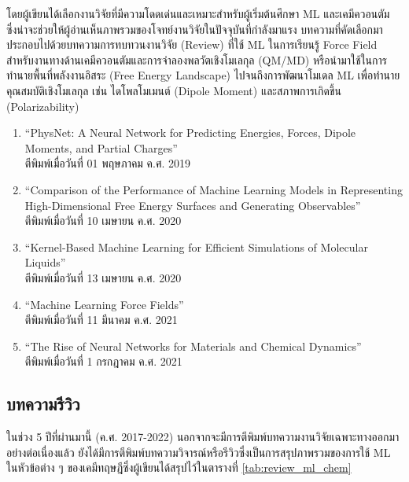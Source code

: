 โดยผู้เขียนได้เลือกงานวิจัยที่มีความโดดเด่นและเหมาะสำหรับผู้เริ่มต้นศึกษา ML และเคมีควอนตัม ซึ่งน่าจะช่วยให้ผู้อ่านเห็นภาพรวมของโจทย์งานวิจัยในปัจจุบันที่กำลังมาแรง บทความที่คัดเลือกมาประกอบไปด้วยบทความการทบทวนงานวิจัย (Review) ที่ใช้ ML ในการเรียนรู้ Force Field สำหรับงานทางด้านเคมีควอนตัมและการจําลองพลวัตเชิงโมเลกุล (QM/MD) หรือนำมาใช้ในการทำนายพื้นที่พลังงานอิสระ (Free Energy Landscape) ไปจนถึงการพัฒนาโมเดล ML เพื่อทำนายคุณสมบัติเชิงโมเลกุล เช่น ไดโพลโมเมนต์ (Dipole Moment) และสภาพการเกิดขึ้น (Polarizability)
%
\begin{enumerate}[topsep=0pt,noitemsep]\setlength\itemsep{0.5em}
    \item \enquote{PhysNet: A Neural Network for Predicting Energies, Forces, Dipole Moments, and Partial Charges}\autocite{unke2019} \\
    ตีพิมพ์เมื่อวันที่ 01 พฤษภาคม ค.ศ. 2019

    \item \enquote{Comparison of the Performance of Machine Learning Models in Representing High-Dimensional Free Energy Surfaces and Generating Observables}\autocite{cendagorta2020} \\
    ตีพิมพ์เมื่อวันที่ 10 เมษายน ค.ศ. 2020

    \item \enquote{Kernel-Based Machine Learning for Efficient Simulations of Molecular Liquids}\autocite{scherer2020} \\
    ตีพิมพ์เมื่อวันที่ 13 เมษายน ค.ศ. 2020

    \item \enquote{Machine Learning Force Fields}\autocite{unke2021} \\
    ตีพิมพ์เมื่อวันที่ 11 มีนาคม ค.ศ. 2021

    \item \enquote{The Rise of Neural Networks for Materials and Chemical Dynamics}\autocite{kulichenko2021} \\
    ตีพิมพ์เมื่อวันที่ 1 กรกฎาคม ค.ศ. 2021
\end{enumerate}

\subsection{บทความรีวิว}
\label{ssec:pred_misc_papers_review}

ในช่วง 5 ปีที่ผ่านมานี้ (ค.ศ. 2017-2022) นอกจากจะมีการตีพิมพ์บทความงานวิจัยเฉพาะทางออกมาอย่างต่อเนื่องแล้ว ยังได้มีการตีพิมพ์บทความวิจารณ์หรือรีวิวซึ่งเป็นการสรุปภาพรวมของการใช้ ML ในหัวข้อต่าง ๆ ของเคมีทฤษฎีซึ่งผู้เขียนได้สรุปไว้ในตารางที่ \ref{tab:review_ml_chem}

